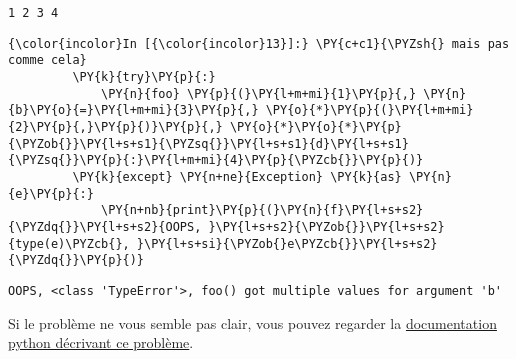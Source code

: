     \begin{Verbatim}[commandchars=\\\{\}]
1 2 3 4

    \end{Verbatim}

    \begin{Verbatim}[commandchars=\\\{\}]
{\color{incolor}In [{\color{incolor}13}]:} \PY{c+c1}{\PYZsh{} mais pas comme cela}
         \PY{k}{try}\PY{p}{:}
             \PY{n}{foo} \PY{p}{(}\PY{l+m+mi}{1}\PY{p}{,} \PY{n}{b}\PY{o}{=}\PY{l+m+mi}{3}\PY{p}{,} \PY{o}{*}\PY{p}{(}\PY{l+m+mi}{2}\PY{p}{,}\PY{p}{)}\PY{p}{,} \PY{o}{*}\PY{o}{*}\PY{p}{\PYZob{}}\PY{l+s+s1}{\PYZsq{}}\PY{l+s+s1}{d}\PY{l+s+s1}{\PYZsq{}}\PY{p}{:}\PY{l+m+mi}{4}\PY{p}{\PYZcb{}}\PY{p}{)}
         \PY{k}{except} \PY{n+ne}{Exception} \PY{k}{as} \PY{n}{e}\PY{p}{:}
             \PY{n+nb}{print}\PY{p}{(}\PY{n}{f}\PY{l+s+s2}{\PYZdq{}}\PY{l+s+s2}{OOPS, }\PY{l+s+s2}{\PYZob{}}\PY{l+s+s2}{type(e)\PYZcb{}, }\PY{l+s+si}{\PYZob{}e\PYZcb{}}\PY{l+s+s2}{\PYZdq{}}\PY{p}{)}
\end{Verbatim}


    \begin{Verbatim}[commandchars=\\\{\}]
OOPS, <class 'TypeError'>, foo() got multiple values for argument 'b'

    \end{Verbatim}

    Si le problème ne vous semble pas clair, vous pouvez regarder la
\href{https://docs.python.org/3/reference/expressions.html\#calls}{documentation
python décrivant ce problème}.


    
    
    
